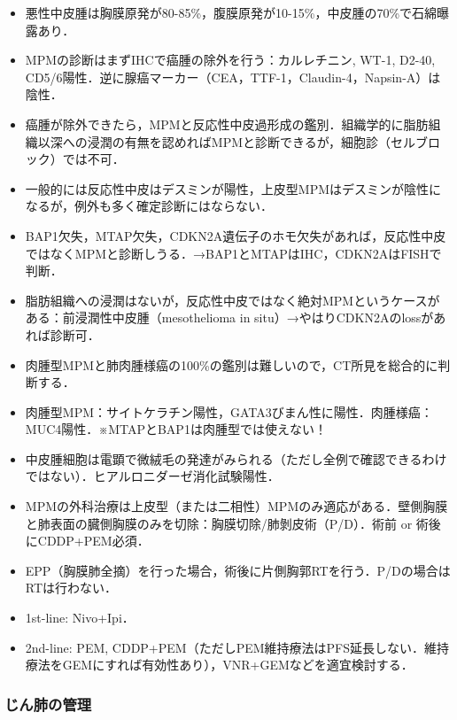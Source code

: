\begin{itemize}
\item 悪性中皮腫は胸膜原発が80-85\%，腹膜原発が10-15\%，中皮腫の70\%で石綿曝露あり．
\item MPMの診断はまずIHCで癌腫の除外を行う：カルレチニン, WT-1, D2-40, CD5/6陽性．逆に腺癌マーカー（CEA，TTF-1，Claudin-4，Napsin-A）は陰性．
\item 癌腫が除外できたら，MPMと反応性中皮過形成の鑑別．組織学的に脂肪組織以深への浸潤の有無を認めればMPMと診断できるが，細胞診（セルブロック）では不可．
\item 一般的には反応性中皮はデスミンが陽性，上皮型MPMはデスミンが陰性になるが，例外も多く確定診断にはならない．
\item BAP1欠失，MTAP欠失，CDKN2A遺伝子のホモ欠失があれば，反応性中皮ではなくMPMと診断しうる．→BAP1とMTAPはIHC，CDKN2AはFISHで判断．
\item 脂肪組織への浸潤はないが，反応性中皮ではなく絶対MPMというケースがある：前浸潤性中皮腫（mesothelioma in situ）→やはりCDKN2Aのlossがあれば診断可．
\item 肉腫型MPMと肺肉腫様癌の100\%の鑑別は難しいので，CT所見を総合的に判断する．
\item 肉腫型MPM：サイトケラチン陽性，GATA3びまん性に陽性．肉腫様癌：MUC4陽性．※MTAPとBAP1は肉腫型では使えない！
\item 中皮腫細胞は電顕で微絨毛の発達がみられる（ただし全例で確認できるわけではない）．ヒアルロニダーゼ消化試験陽性．
\item MPMの外科治療は上皮型（または二相性）MPMのみ適応がある．壁側胸膜と肺表面の臓側胸膜のみを切除：胸膜切除/肺剝皮術（P/D）．術前 or 術後にCDDP+PEM必須．
\item EPP（胸膜肺全摘）を行った場合，術後に片側胸郭RTを行う．P/Dの場合はRTは行わない．
\item 1st-line: Nivo+Ipi．
\item 2nd-line: PEM, CDDP+PEM（ただしPEM維持療法はPFS延長しない．維持療法をGEMにすれば有効性あり），VNR+GEMなどを適宜検討する．
\end{itemize}


\subsubsection{じん肺の管理}

